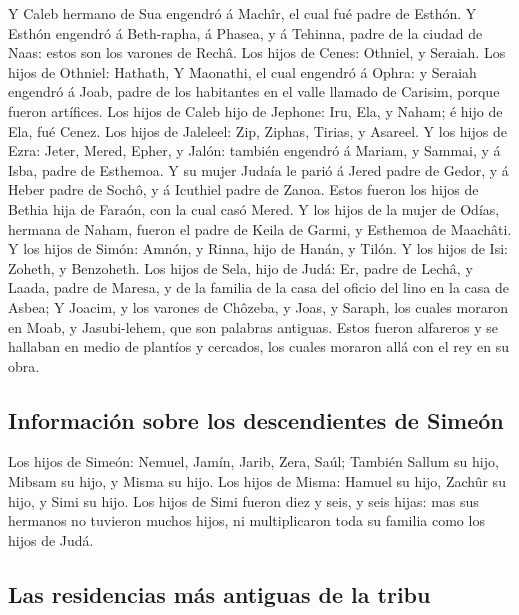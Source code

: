  Y Caleb hermano de Sua engendró á Machîr, el cual fué
padre de Esthón.  Y Esthón engendró á Beth-rapha, á
Phasea, y á Tehinna, padre de la ciudad de Naas: estos son los varones
de Rechâ.  Los hijos de Cenes: Othniel, y Seraiah. Los
hijos de Othniel: Hathath,  Y Maonathi, el cual engendró
á Ophra: y Seraiah engendró á Joab, padre de los habitantes en el valle
llamado de Carisim, porque fueron artífices.  Los hijos
de Caleb hijo de Jephone: Iru, Ela, y Naham; é hijo de Ela, fué Cenez.
 Los hijos de Jaleleel: Zip, Ziphas, Tirias, y Asareel.
 Y los hijos de Ezra: Jeter, Mered, Epher, y Jalón:
también engendró á Mariam, y Sammai, y á Isba, padre de Esthemoa.
 Y su mujer Judaía le parió á Jered padre de Gedor, y á
Heber padre de Sochô, y á Icuthiel padre de Zanoa. Estos fueron los
hijos de Bethia hija de Faraón, con la cual casó Mered. 
Y los hijos de la mujer de Odías, hermana de Naham, fueron el padre de
Keila de Garmi, y Esthemoa de Maachâti.  Y los hijos de
Simón: Amnón, y Rinna, hijo de Hanán, y Tilón. Y los hijos de Isi:
Zoheth, y Benzoheth.  Los hijos de Sela, hijo de Judá:
Er, padre de Lechâ, y Laada, padre de Maresa, y de la familia de la casa
del oficio del lino en la casa de Asbea;  Y Joacim, y los
varones de Chôzeba, y Joas, y Saraph, los cuales moraron en Moab, y
Jasubi-lehem, que son palabras antiguas.  Estos fueron
alfareros y se hallaban en medio de plantíos y cercados, los cuales
moraron allá con el rey en su obra.

\hypertarget{informaciuxf3n-sobre-los-descendientes-de-simeuxf3n}{%
\subsection{Información sobre los descendientes de
Simeón}\label{informaciuxf3n-sobre-los-descendientes-de-simeuxf3n}}

 Los hijos de Simeón: Nemuel, Jamín, Jarib, Zera, Saúl;
 También Sallum su hijo, Mibsam su hijo, y Misma su hijo.
 Los hijos de Misma: Hamuel su hijo, Zachûr su hijo, y
Simi su hijo.  Los hijos de Simi fueron diez y seis, y
seis hijas: mas sus hermanos no tuvieron muchos hijos, ni multiplicaron
toda su familia como los hijos de Judá.

\hypertarget{las-residencias-muxe1s-antiguas-de-la-tribu}{%
\subsection{Las residencias más antiguas de la
tribu}\label{las-residencias-muxe1s-antiguas-de-la-tribu}}

